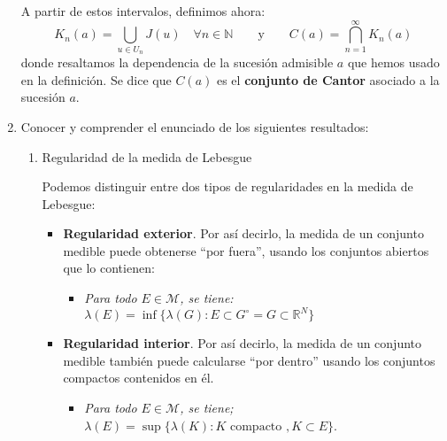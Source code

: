\documentclass[a4paper, 12pt]{article}
\begin{document}
\begin{enumerate}[label=\textbf{\arabic*}.]
A partir de estos intervalos, definimos ahora:
\[
	K_n(a) = \bigcup_{u \in U_n} J(u) \quad \forall n \in \mathbb{N} \qquad \text{y} \qquad C(a) = \bigcap_{n=1}^{\infty} K_n(a)
\]
donde resaltamos la dependencia de la sucesión admisible \(a\) que hemos usado en la definición. Se dice que \(C(a)\) es el \textbf{conjunto de Cantor} asociado a la sucesión \(a\).

\newpage

\item Conocer y comprender el enunciado de los siguientes resultados:
\begin{enumerate}[label=\textit{\alph*})]
	\item Regularidad de la medida de Lebesgue
	
Podemos distinguir entre dos tipos de regularidades en la medida de Lebesgue:
\begin{itemize}
	\item \textbf{Regularidad exterior}. Por así decirlo, la medida de un conjunto medible puede obtenerse ``por fuera'', usando los conjuntos abiertos que lo contienen:
	\begin{itemize}
		\item \textit{Para todo \(E \in \mathcal{M}\), se tiene: \(\lambda(E) = \inf \{ \lambda(G) : E \subset G^{\circ} = G \subset \mathbb{R}^N\}\)}
	\end{itemize}
	
	\item \textbf{Regularidad interior}. Por así decirlo, la medida de un conjunto medible también puede calcularse ``por dentro'' usando los conjuntos compactos contenidos en él. 
	\begin{itemize}
		\item \textit{Para todo \(E \in \mathcal{M}\), se tiene; \(\lambda(E) = \sup \{\lambda(K): K \text{ compacto }, K \subset E\}\)}.
	\end{itemize}
\end{itemize}


\end{enumerate}
\end{enumerate}
\end{document}

